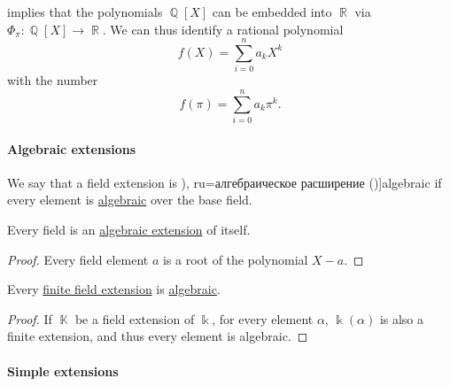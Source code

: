 \begin{example}\label{ex:polynomials_over_pi}
   implies that the polynomials \( \BbbQ[X] \) can be embedded into \( \BbbR \) via \( \Phi_\pi: \BbbQ[X] \to \BbbR \). We can thus identify a rational polynomial
  \begin{equation*}
    f(X) = \sum_{i=0}^n a_k X^k
  \end{equation*}
  with the number
  \begin{equation*}
    f(\pi) = \sum_{i=0}^n a_k \pi^k.
  \end{equation*}
\end{example}

\paragraph{Algebraic extensions}

\begin{definition}\label{def:algebraic_extension}
  We say that a field extension is \term[bg=алгебрично разширение (\cite[201]{ГеновМиховскиМоллов1991Алгебра}), ru=алгебраическое расширение (\cite[408]{Винберг2014Алгебра})]{algebraic} if every element is \hyperref[def:algebraic_element]{algebraic} over the base field.
\end{definition}

\begin{proposition}\label{thm:field_is_algebraic_over_itself}
  Every field is an \hyperref[def:algebraic_extension]{algebraic extension} of itself.
\end{proposition}
\begin{proof}
  Every field element \( a \) is a root of the polynomial \( X - a \).
\end{proof}

\begin{proposition}\label{thm:finite_field_extensions_are_algebraic}
  Every \hyperref[def:field_extension_degree]{finite field extension} is \hyperref[def:algebraic_extension]{algebraic}.
\end{proposition}
\begin{proof}
  If \( \BbbK \) be a field extension of \( \Bbbk \), for every element \( \alpha \), \( \Bbbk(\alpha) \) is also a finite extension, and thus every element is algebraic.
\end{proof}

\paragraph{Simple extensions}

